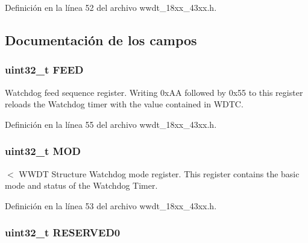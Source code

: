Definición en la línea 52 del archivo wwdt\+\_\+18xx\+\_\+43xx.\+h.



\subsection{Documentación de los campos}
\subsubsection[{\texorpdfstring{F\+E\+ED}{FEED}}]{ uint32\+\_\+t F\+E\+ED}\hypertarget{struct_l_p_c___w_w_d_t___t_afb3d081ef6e3f567ec250f7e0abc26a4}{}\label{struct_l_p_c___w_w_d_t___t_afb3d081ef6e3f567ec250f7e0abc26a4}
Watchdog feed sequence register. Writing 0x\+AA followed by 0x55 to this register reloads the Watchdog timer with the value contained in W\+D\+TC. 

Definición en la línea 55 del archivo wwdt\+\_\+18xx\+\_\+43xx.\+h.

\subsubsection[{\texorpdfstring{M\+OD}{MOD}}]{ uint32\+\_\+t M\+OD}\hypertarget{struct_l_p_c___w_w_d_t___t_aa35a6713b1e2aafa0749f986730795cb}{}\label{struct_l_p_c___w_w_d_t___t_aa35a6713b1e2aafa0749f986730795cb}
$<$ W\+W\+DT Structure Watchdog mode register. This register contains the basic mode and status of the Watchdog Timer. 

Definición en la línea 53 del archivo wwdt\+\_\+18xx\+\_\+43xx.\+h.

\subsubsection[{\texorpdfstring{R\+E\+S\+E\+R\+V\+E\+D0}{RESERVED0}}]{ uint32\+\_\+t R\+E\+S\+E\+R\+V\+E\+D0}\hypertarget{struct_l_p_c___w_w_d_t___t_ad06839c5382047f4f9f2c74cc61db942}{}\label{struct_l_p_c___w_w_d_t___t_ad06839c5382047f4f9f2c74cc61db942}



